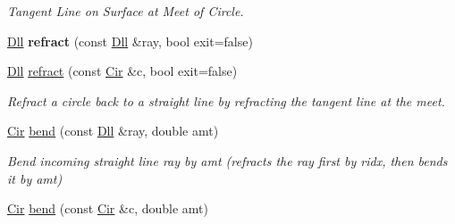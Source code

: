 \begin{DoxyCompactItemize}
\begin{DoxyCompactList}\small\item\em Tangent Line on Surface at Meet of Circle. \end{DoxyCompactList}\item 
\hypertarget{structvsr_1_1_optical_surface_a2e2e16f3b05c1cd81596c18d1685ca00}{\hyperlink{namespacevsr_a6c6892b7aec25cfb16492501e2e35b11}{Dll} {\bfseries refract} (const \hyperlink{namespacevsr_a6c6892b7aec25cfb16492501e2e35b11}{Dll} \&ray, bool exit=false)}\label{structvsr_1_1_optical_surface_a2e2e16f3b05c1cd81596c18d1685ca00}

\item 
\hypertarget{structvsr_1_1_optical_surface_a1e405a801f3e87dd62c5a7c87e7cc4e7}{\hyperlink{namespacevsr_a6c6892b7aec25cfb16492501e2e35b11}{Dll} \hyperlink{structvsr_1_1_optical_surface_a1e405a801f3e87dd62c5a7c87e7cc4e7}{refract} (const \hyperlink{namespacevsr_a2744605aa828e495fc85463b7ae0d045}{Cir} \&c, bool exit=false)}\label{structvsr_1_1_optical_surface_a1e405a801f3e87dd62c5a7c87e7cc4e7}

\begin{DoxyCompactList}\small\item\em Refract a circle back to a straight line by refracting the tangent line at the meet. \end{DoxyCompactList}\item 
\hypertarget{structvsr_1_1_optical_surface_a7bd89eaa7b175bfcc5a4b91e9e88b2fe}{\hyperlink{namespacevsr_a2744605aa828e495fc85463b7ae0d045}{Cir} \hyperlink{structvsr_1_1_optical_surface_a7bd89eaa7b175bfcc5a4b91e9e88b2fe}{bend} (const \hyperlink{namespacevsr_a6c6892b7aec25cfb16492501e2e35b11}{Dll} \&ray, double amt)}\label{structvsr_1_1_optical_surface_a7bd89eaa7b175bfcc5a4b91e9e88b2fe}

\begin{DoxyCompactList}\small\item\em Bend incoming straight line ray by amt (refracts the ray first by ridx, then bends it by amt) \end{DoxyCompactList}\item 
\hypertarget{structvsr_1_1_optical_surface_ac522aa034b1fc4b69774fd1d495503fe}{\hyperlink{namespacevsr_a2744605aa828e495fc85463b7ae0d045}{Cir} \hyperlink{structvsr_1_1_optical_surface_ac522aa034b1fc4b69774fd1d495503fe}{bend} (const \hyperlink{namespacevsr_a2744605aa828e495fc85463b7ae0d045}{Cir} \&c, double amt)}\label{structvsr_1_1_optical_surface_ac522aa034b1fc4b69774fd1d495503fe}


\end{DoxyCompactItemize}
